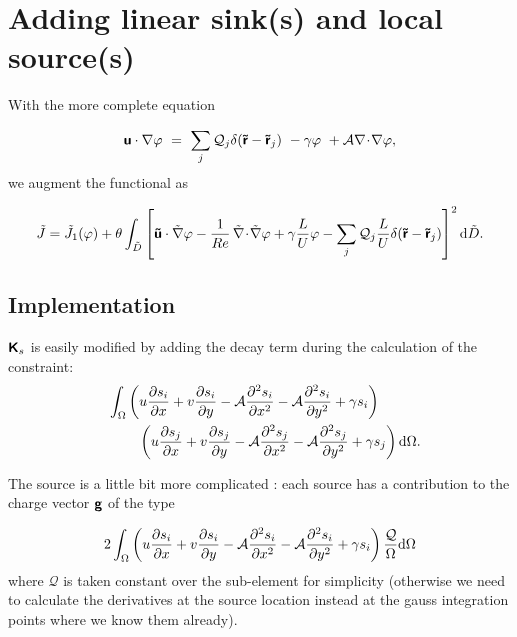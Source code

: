 \section{Adding linear sink(s) and local source(s)}
With the more complete equation

\begin{equation}
\mbox{\boldmath $ \protect\mathsf{u} $} \cdot {\nabla} \varphi
~=~ \sum_j \mathcal{Q}_j\delta( \mbox{\boldmath $ \protect\mathsf{\tilde{r}} $}-\mbox{\boldmath $ \protect\mathsf{\tilde{r}} $}_j ) ~-\gamma \varphi ~+ \mathcal{A}  {\nabla}\! \cdot\! {\nabla}\varphi ,
\end{equation}
we augment the functional as

\begin{equation}
\tilde{J}= \tilde{J}_1(\varphi) + {\theta  } \int_{\tilde{D}}\left[ 
\mbox{\boldmath $ \protect\mathsf{\tilde{u}} $} \cdot \tilde{\nabla} \varphi
- {1  \over Re} \, \tilde{\nabla}\! \cdot\! \tilde{\nabla}\varphi
 +  \gamma {L \over U}  \varphi   - \sum_j \mathcal{Q}_j {L \over U} \delta( \mbox{\boldmath $ \protect\mathsf{\tilde{r}} $}-\mbox{\boldmath $ \protect\mathsf{\tilde{r}} $}_j ) \right]^2 \mbox{d} \tilde{D}.
\end{equation}

\subsection{Implementation}


$\mbox{\boldmath $ \protect\mathsf{K} $}_s$ is easily modified by adding the decay term during the calculation of the constraint:
\begin{eqnarray}
\int_\Omega \left( u {\partial s_i \over \partial x}+v {\partial s_i \over \partial y}-\mathcal{A} {\partial^2 s_i \over \partial x^2} -\mathcal{A} {\partial^2 s_i \over \partial y^2}+ \gamma s_i \right) \quad \quad \quad \notag \\
\quad \quad \quad \left( u {\partial s_j \over \partial x}+v {\partial s_j \over \partial y}-\mathcal{A} {\partial^2 s_j \over \partial x^2} -\mathcal{A} {\partial^2 s_j \over \partial y^2}
+\gamma s_j
\right)\mbox{d} \Omega. \notag 
\end{eqnarray}

The source is a little bit more complicated :
each source has a contribution to the charge vector $\mbox{\boldmath $ \protect\mathsf{g} $}$ of the type

\begin{equation}
2 \int_\Omega \left( u {\partial s_i \over \partial x}+v {\partial s_i \over \partial y}-\mathcal{A} {\partial^2 s_i \over \partial x^2} -\mathcal{A} {\partial^2 s_i \over \partial y^2}+ \gamma s_i \right) {\mathcal{Q} \over \Omega} \mbox{d} \Omega
\end{equation}
where $\mathcal{Q}$ is taken constant over the sub-element for simplicity (otherwise we need to calculate the derivatives at the source location instead at the gauss integration points where we know them already).


